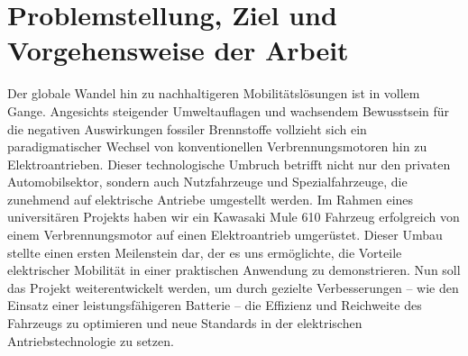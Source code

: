 \chapter{Problemstellung, Ziel und Vorgehensweise der Arbeit}
\label{cha:Problemstellung, Ziel und Vorgehensweise der Arbeit}

Der globale Wandel hin zu nachhaltigeren Mobilitätslösungen ist in vollem Gange. Angesichts steigender Umweltauflagen und wachsendem Bewusstsein für die negativen Auswirkungen fossiler Brennstoffe vollzieht sich ein paradigmatischer Wechsel von konventionellen Verbrennungsmotoren hin zu Elektroantrieben. Dieser technologische Umbruch betrifft nicht nur den privaten Automobilsektor, sondern auch Nutzfahrzeuge und Spezialfahrzeuge, die zunehmend auf elektrische Antriebe umgestellt werden.\autocite{Pischinger2023}
Im Rahmen eines universitären Projekts haben wir ein Kawasaki Mule 610 Fahrzeug erfolgreich von einem Verbrennungsmotor auf einen Elektroantrieb umgerüstet. Dieser Umbau stellte einen ersten Meilenstein dar, der es uns ermöglichte, die Vorteile elektrischer Mobilität in einer praktischen Anwendung zu demonstrieren. Nun soll das Projekt weiterentwickelt werden, um durch gezielte Verbesserungen – wie den Einsatz einer leistungsfähigeren Batterie – die Effizienz und Reichweite des Fahrzeugs zu optimieren und neue Standards in der elektrischen Antriebstechnologie zu setzen.

